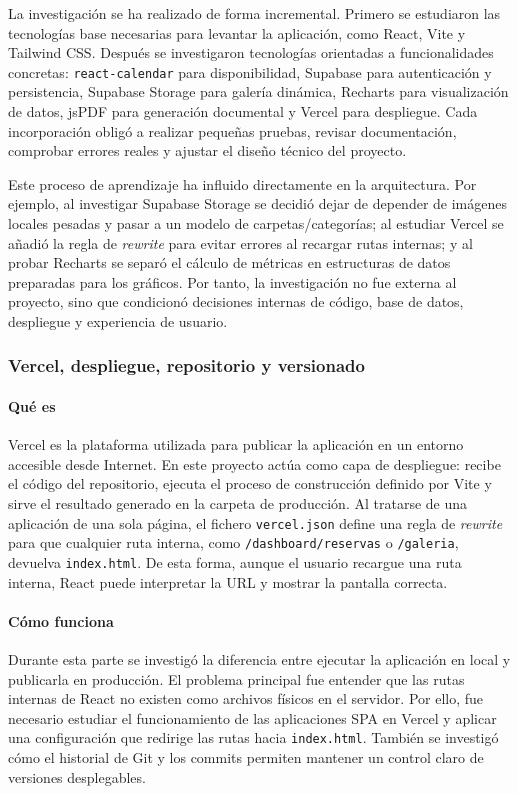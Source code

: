 \documentclass[11pt,a4paper]{article}
\begin{document}
La investigación se ha realizado de forma incremental. Primero se estudiaron las tecnologías base necesarias para levantar la aplicación, como React, Vite y Tailwind CSS. Después se investigaron tecnologías orientadas a funcionalidades concretas: \texttt{react-calendar} para disponibilidad, Supabase para autenticación y persistencia, Supabase Storage para galería dinámica, Recharts para visualización de datos, jsPDF para generación documental y Vercel para despliegue. Cada incorporación obligó a realizar pequeñas pruebas, revisar documentación, comprobar errores reales y ajustar el diseño técnico del proyecto.

Este proceso de aprendizaje ha influido directamente en la arquitectura. Por ejemplo, al investigar Supabase Storage se decidió dejar de depender de imágenes locales pesadas y pasar a un modelo de carpetas/categorías; al estudiar Vercel se añadió la regla de \textit{rewrite} para evitar errores al recargar rutas internas; y al probar Recharts se separó el cálculo de métricas en estructuras de datos preparadas para los gráficos. Por tanto, la investigación no fue externa al proyecto, sino que condicionó decisiones internas de código, base de datos, despliegue y experiencia de usuario.

\subsubsection{Vercel, despliegue, repositorio y versionado}
\paragraph{Qué es}
Vercel es la plataforma utilizada para publicar la aplicación en un entorno accesible desde Internet. En este proyecto actúa como capa de despliegue: recibe el código del repositorio, ejecuta el proceso de construcción definido por Vite y sirve el resultado generado en la carpeta de producción. Al tratarse de una aplicación de una sola página, el fichero \texttt{vercel.json} define una regla de \textit{rewrite} para que cualquier ruta interna, como \texttt{/dashboard/reservas} o \texttt{/galeria}, devuelva \texttt{index.html}. De esta forma, aunque el usuario recargue una ruta interna, React puede interpretar la URL y mostrar la pantalla correcta.

\paragraph{Cómo funciona}
Durante esta parte se investigó la diferencia entre ejecutar la aplicación en local y publicarla en producción. El problema principal fue entender que las rutas internas de React no existen como archivos físicos en el servidor. Por ello, fue necesario estudiar el funcionamiento de las aplicaciones SPA en Vercel y aplicar una configuración que redirige las rutas hacia \texttt{index.html}. También se investigó cómo el historial de Git y los commits permiten mantener un control claro de versiones desplegables.
\end{document}
